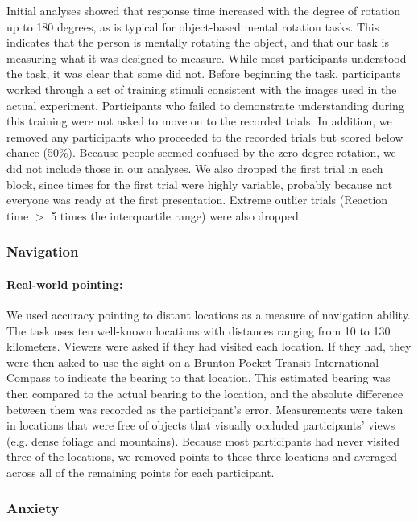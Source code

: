 Initial analyses showed that response time increased with the degree of rotation up to 180 degrees, as is typical for object-based mental rotation tasks.  This indicates that the person is mentally rotating the object, and that our task is measuring what it was designed to measure. While most participants understood the task, it was clear that some did not. Before beginning the task, participants worked through a set of training stimuli consistent with the images used in the actual experiment.  Participants who failed to demonstrate understanding during this training were not asked to move on to the recorded trials.  In addition, we removed any participants who proceeded to the recorded trials but scored below chance (50\%).  Because people seemed confused by the zero degree rotation, we did not include those in our analyses.  We also dropped the first trial in each block, since times for the first trial were highly variable, probably because not everyone was ready at the first presentation. Extreme outlier trials (Reaction time $>$ 5 times the interquartile range) were also dropped.

		\subsubsection{Navigation}
		\label{sec:2.2.2}
\paragraph{Real-world pointing:}  We used accuracy pointing to distant locations as a measure of navigation ability. The task uses ten well-known locations with distances ranging from 10 to 130 kilometers.  Viewers were asked if they had visited each location. If they had, they were then asked to use the sight on a Brunton Pocket Transit International Compass to indicate the bearing to that location. This estimated bearing was then compared to the actual bearing to the location, and the absolute difference between them was recorded as the participant's error. Measurements were taken in locations that were free of objects that visually occluded participants' views (e.g. dense foliage and mountains).  Because most participants had never visited three of the locations, we removed points to these three locations and averaged across all of the remaining points for each participant.

		\subsubsection{Anxiety}
		\label{sec:2.2.3}
		
